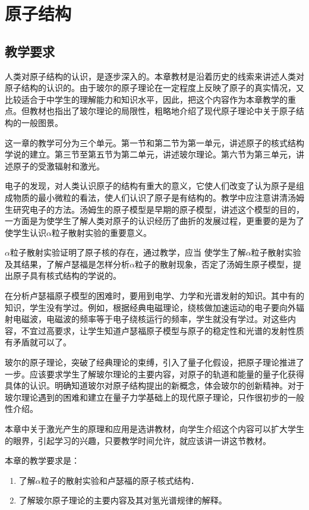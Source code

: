\chapter{原子结构}\minitoc[n]
\section{教学要求}
人类对原子结构的认识，是逐步深入的。本章教材是沿着历史的线索来讲述人类对原子结构的认识的。由于玻尔的原子理论在一定程度上反映了原子的真实情况，又比较适合于中学生的理解能力和知识水平，因此，把这个内容作为本章教学的重点。但教材也指出了玻尔理论的局限性，粗略地介绍了现代原子理论中关于原子结构的一般图景。

这一章的教学可分为三个单元。第一节和第二节为第一单元，讲述原子的核式结构学说的建立。第三节至第五节为第二单元，讲述玻尔理论。第六节为第三单元，讲述原子的受激辐射和激光。

电子的发现，对人类认识原子的结构有重大的意义，它使人们改变了认为原子是组成物质的最小微粒的看法，使人们认识了原子是有结构的。教学中应注意讲清汤姆生研究电子的方法。汤姆生的原子模型是早期的原子模型，讲述这个模型的目的，一方面是为使学生了解人类对原子的认识经历了曲折的发展过程，更重要的是为了使学生认识$\alpha$粒子散射实验的重要意义。

$\alpha$粒子散射实验证明了原子核的存在，通过教学，应当
使学生了解$\alpha$粒子散射实验及其结果，了解卢瑟福是怎样分析$\alpha$粒子的散射现象，否定了汤姆生原子模型，提出原子具有核式结构的学说的。

在分析卢瑟福原子模型的困难时，要用到电学、力学和光谱发射的知识。其中有的知识，学生没有学过。例如，根据经典电磁理论，绕核做加速运动的电子要向外辐射电磁波，电磁波的频率等于电子绕核运行的频率，学生就没有学过。对这些内容，不宜过高要求，让学生知道卢瑟福原子模型与原子的稳定性和光谱的发射性质有矛盾就可以了。

玻尔的原子理论，突破了经典理论的束缚，引入了量子化假设，把原子理论推进了一步。应该要求学生了解玻尔理论的主要内容，对原子的轨道和能量的量子化获得具体的认识。明确知道玻尔对原子结构提出的新概念，体会玻尔的创新精神。对于玻尔理论遇到的困难和建立在量子力学基础上的现代原子理论，只作很初步的一般性介绍。

本章中关于激光产生的原理和应用是选讲教材，向学生介绍这个内容可以扩大学生的眼界，引起学习的兴趣，只要教学时间允许，就应该讲一讲这节教材。

本章的教学要求是：
\begin{enumerate}
\item 了解$\alpha$粒子的散射实验和卢瑟福的原子核式结构．
\item 了解玻尔原子理论的主要内容及其对氢光谱规律的解释。
\end{enumerate}

